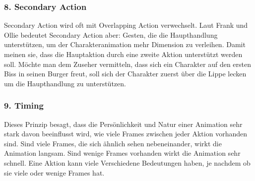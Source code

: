 \subsubsection{8. Secondary Action}
Secondary Action wird oft mit Overlapping Action verwechselt.
Laut Frank und Ollie bedeutet Secondary Action aber: Gesten, die die Haupthandlung unterstützen, um der Charakteranimation mehr Dimension zu verleihen.
Damit meinen sie, dass die Hauptaktion durch eine zweite Aktion unterstützt werden soll. Möchte man dem Zuseher vermitteln, dass sich ein
Charakter auf den ersten Biss in seinen Burger freut, soll sich der Charakter zuerst über die Lippe lecken um die Haupthandlung zu unterstützen.

\subsubsection{9. Timing}
Dieses Prinzip besagt, dass die Persönlichkeit und Natur einer Animation sehr stark davon beeinflusst wird, wie viele Frames zwischen jeder Aktion
vorhanden sind. Sind viele Frames, die sich ähnlich sehen nebeneinander, wirkt die Animation langsam. Sind wenige Frames vorhanden wirkt die Animation sehr schnell.
Eine Aktion kann viele Verschiedene Bedeutungen haben, je nachdem ob sie viele oder wenige Frames hat.

